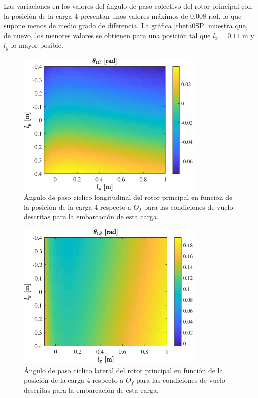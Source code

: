 Las variaciones en los valores del ángulo de paso colectivo del rotor principal con la posición de la carga 4 presentan unos valores máximos de 0.008 rad, lo que supone menos de medio grado de diferencia. La gráfica \ref{theta0SP} muestra que, de nuevo, los menores valores se obtienen para una posición tal que $l_x=0.11$ m y $l_y$ lo mayor posible.

\begin{figure}
	\centering
	\includegraphics[width=90mm]{graficos/theta1CSP}
	\caption{Ángulo de paso cíclico longitudinal del rotor principal en función de la posición de la carga 4 respecto a $O_f$ para las condiciones de vuelo descritas para la embarcación de esta carga.}
	\label{theta1CSP}
\end{figure}
\begin{figure}
	\centering
	\includegraphics[width=90mm]{graficos/theta1SSP}
	\caption{Ángulo de paso cíclico lateral del rotor principal en función de la posición de la carga 4 respecto a $O_f$ para las condiciones de vuelo descritas para la embarcación de esta carga.}
	\label{theta1SSP}
\end{figure}

